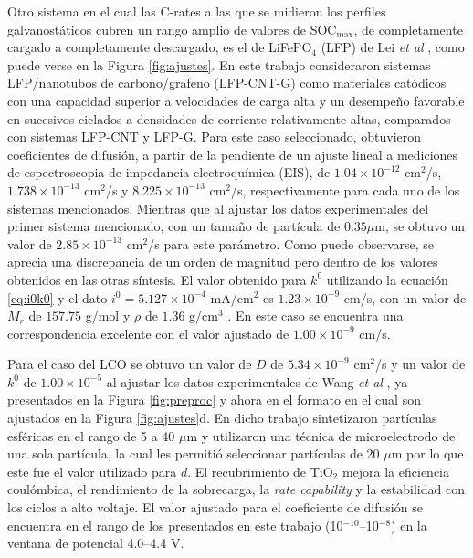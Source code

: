 Otro sistema en el cual las C-rates a las que se midieron los perfiles 
galvanostáticos cubren un rango amplio de valores de SOC$_{\max}$, de 
completamente cargado a completamente descargado, es el de LiFePO$_4$ (LFP) de 
Lei \textit{et al} \cite{lei2015}, como puede verse en la Figura 
\ref{fig:ajustes}. En este trabajo consideraron sistemas LFP/nanotubos de 
carbono/grafeno (LFP-CNT-G) como materiales catódicos con una capacidad 
superior a velocidades de carga alta y un desempeño favorable en sucesivos 
ciclados a densidades de corriente relativamente altas, comparados con 
sistemas LFP-CNT y LFP-G. Para este caso seleccionado, obtuvieron coeficientes 
de difusión, a partir de la pendiente de un ajuste lineal a mediciones de 
espectroscopia de impedancia electroquímica (EIS), de $1.04\times10^{-12}$ 
cm$^2$/s, $1.738\times10^{-13}$ cm$^2$/s y $8.225\times10^{-13}$ cm$^2$/s, 
respectivamente para cada uno de los sistemas mencionados. Mientras que al
ajustar los datos experimentales del primer sistema mencionado, con un tamaño
de partícula de $0.35 \mu$m, se obtuvo un valor de $2.85\times10^{-13}$ cm$^2$/s
para este parámetro. Como puede observarse, se aprecia una discrepancia de un 
orden de magnitud pero dentro de los valores obtenidos en las otras síntesis.
El valor obtenido para $k^0$ utilizando la ecuación \ref{eq:i0k0} y el dato 
$i^0=5.127\times10^{-4}$ mA/cm$^2$ es $1.23\times10^{-9}$ cm/s, con un valor
de $M_r$ de $157.75$ g/mol y $\rho$ de $1.36$ g/cm$^3$ \cite{jin2018}.
En este caso se encuentra una correspondencia excelente con el valor ajustado
de $1.00\times10^{-9}$ cm/s.

Para el caso del LCO se obtuvo un valor de $D$ de $5.34\times10^{-9}$ cm$^2$/s y
un valor de $k^0$ de $1.00\times10^{-5}$ al ajustar los datos experimentales 
de Wang \textit{et al} \cite{wang2019high}, ya presentados en la Figura 
\ref{fig:preproc} y ahora en el formato en el cual son ajustados en la Figura 
\ref{fig:ajustes}d. En dicho trabajo sintetizaron partículas esféricas en el rango
de 5 a 40 $\mu$m y utilizaron una técnica de microelectrodo de una sola partícula,
la cual les permitió seleccionar partículas de 20 $\mu$m por lo que este fue el
valor utilizado para $d$. El recubrimiento de TiO$_2$ mejora la eficiencia 
coulómbica, el rendimiento de la sobrecarga, la \textit{rate capability} y la
estabilidad con los ciclos a alto voltaje. El valor ajustado para el coeficiente 
de difusión se encuentra en el rango de los presentados en este trabajo 
(10$^{-10}$--10$^{-8}$) en la ventana de potencial 4.0--4.4 V.

